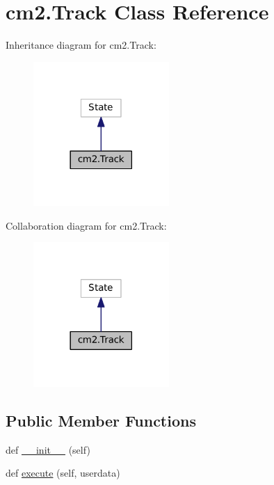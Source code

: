\hypertarget{classcm2_1_1Track}{}\section{cm2.\+Track Class Reference}
\label{classcm2_1_1Track}


Inheritance diagram for cm2.\+Track\+:\nopagebreak
\begin{figure}[H]
\begin{center}
\leavevmode
\includegraphics[width=146pt]{classcm2_1_1Track__inherit__graph}
\end{center}
\end{figure}


Collaboration diagram for cm2.\+Track\+:\nopagebreak
\begin{figure}[H]
\begin{center}
\leavevmode
\includegraphics[width=146pt]{classcm2_1_1Track__coll__graph}
\end{center}
\end{figure}
\subsection*{Public Member Functions}
\begin{DoxyCompactItemize}
\item 
def \hyperlink{classcm2_1_1Track_a5fe48c911d5612b28dde80ddc1cfce3d}{\+\_\+\+\_\+init\+\_\+\+\_\+} (self)
\item 
def \hyperlink{classcm2_1_1Track_aa3cad68bc8957f18b359020896e006d5}{execute} (self, userdata)
\end{DoxyCompactItemize}
